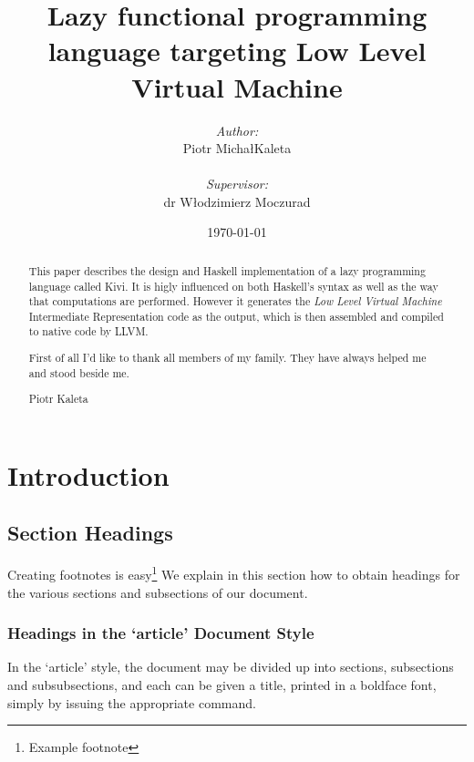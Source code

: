 \documentclass[a4paper]{report}
\begin{document}
\title{Lazy functional programming language targeting Low Level Virtual Machine}
\author{\emph{Author:}\\Piotr Micha\l{}Kaleta\\\\\emph{Supervisor:}\\dr W\l{}odzimierz Moczurad}
\date{\today}

\maketitle
{}

\newpage
\thispagestyle{empty}
\mbox{}

\Huge
\begin{abstract}
\normalsize
\center
This paper describes the design and Haskell implementation of a lazy
programming language called Kivi. It is higly influenced on both Haskell's
syntax as well as the way that computations are performed. However it generates
the \emph{Low Level Virtual Machine}\cite{wiki:llvm} Intermediate
Representation code as the output, which is then assembled and compiled to
native code by LLVM.
\end{abstract}


\renewcommand{\abstractname}{Acknowledgements}
\begin{abstract}
\normalsize
\center
First of all I'd like to thank all members of my family. They have always
helped me and stood beside me.
\begin{flushright}
Piotr Kaleta
\end{flushright}
\end{abstract}

\normalsize
{}

\tableofcontents

\chapter{Introduction}

\section{Section Headings}

Creating footnotes is easy\footnote{Example footnote}
We explain in this section how to obtain headings
for the various sections and subsections of our
document.

\subsection{Headings in the `article' Document Style}

In the `article' style, the document may be divided up
into sections, subsections and subsubsections, and each
can be given a title, printed in a boldface font, simply by issuing the
appropriate command.
\end{document}

